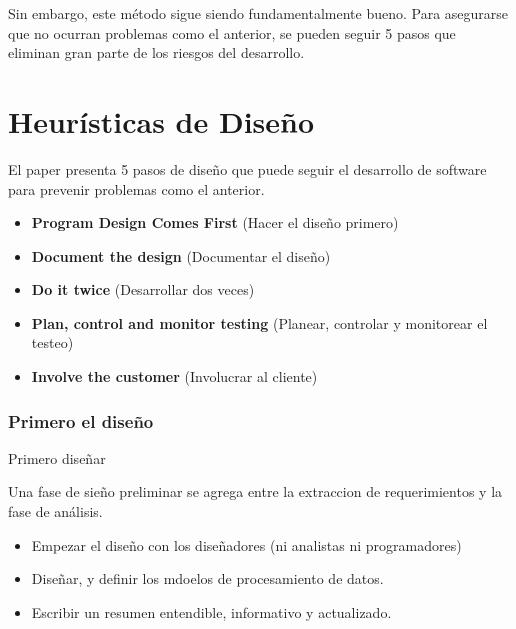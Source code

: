\documentclass{beamer}
\begin{document}
\begin{frame}[fragile]

Sin embargo, este método sigue siendo fundamentalmente bueno. Para asegurarse que no ocurran problemas como el anterior, se pueden seguir 5 pasos que eliminan gran parte de los riesgos del desarrollo.

\end{frame}

\section{Heurísticas de Diseño}

\begin{frame}
El paper presenta 5 pasos de diseño que puede seguir el desarrollo de software para prevenir problemas como el anterior.

\begin{itemize}
\item<2-> \textbf{Program Design Comes First} (Hacer el diseño primero)
\item<3-> \textbf{Document the design} (Documentar el diseño)
\item<4-> \textbf{Do it twice} (Desarrollar dos veces)
\item<5-> \textbf{Plan, control and monitor testing} (Planear, controlar y monitorear el testeo)
\item<6-> \textbf{Involve the customer} (Involucrar al cliente)
\end{itemize}

\end{frame}

\subsubsection{Primero el diseño}

\begin{frame}{Primero diseñar}

Una fase de sieño preliminar se agrega entre la extraccion de requerimientos y la fase de análisis.

\begin{itemize}
\item Empezar el diseño con los diseñadores (ni analistas ni programadores)
\item Diseñar, y definir los mdoelos de procesamiento de datos.
\item Escribir un resumen entendible, informativo y actualizado.

\end{itemize}

\end{frame}
\end{document}
